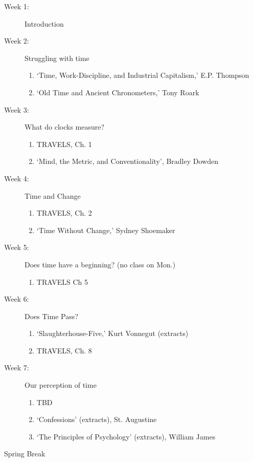 \documentclass[article,oneside]{memoir}
\begin{document}
\begin{description}

\item[Week 1:] Introduction

\item[Week 2:]  Struggling with time
\begin{enumerate}
\item `Time, Work-Discipline, and Industrial Capitalism,' E.P. Thompson
\item `Old Time and Ancient Chronometers,' Tony Roark
\end{enumerate}

\item[Week 3:] What do clocks measure? 
\begin{enumerate}
\item TRAVELS, Ch. 1
\item `Mind, the Metric, and Conventionality', Bradley Dowden
\end{enumerate}

\item[Week 4:] Time and Change
\begin{enumerate}
\item TRAVELS, Ch. 2
\item  `Time Without Change,' Sydney Shoemaker
\end{enumerate}

\item[Week 5:] Does time have a beginning? (no class on Mon.)
\begin{enumerate}
\item TRAVELS Ch 5
\end{enumerate}

\item[Week 6:] Does Time Pass? 
\begin{enumerate}
\item `Slaughterhouse-Five,' Kurt Vonnegut (extracts)
\item TRAVELS, Ch. 8
\end{enumerate}

\item[Week 7:] Our perception of time
\begin{enumerate}
\item TBD
\item `Confessions' (extracts),  St. Augustine
\item `The Principles of Psychology' (extracts), William James
\end{enumerate}


\item [Spring Break]


\end{description}
\end{document}
